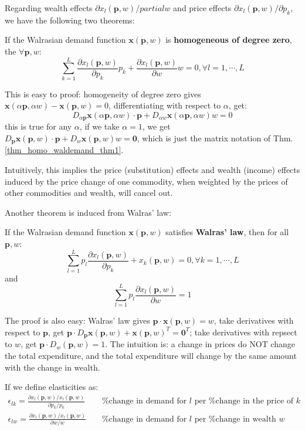 Regarding wealth effects $\partial x_l(\mathbf{p},w)/partial w$ and price effects $\partial x_l(\mathbf{p},w)/\partial p_k$, we have the following two theorems:

\begin{theorem}\label{thm_homo_waldemand_thm1}
    If the Walrasian demand function $\mathbf{x}(\mathbf{p},w)$ is \textbf{homogeneous of degree zero}, the $\forall \mathbf{p},w$:
    $$\sum^L_{k=1}\frac{\partial x_l(\mathbf{p},w)}{\partial p_k}p_k +\frac{\partial x_l(\mathbf{p},w)}{\partial w}w=0,\forall l=1,\cdots,L$$
\end{theorem}

This is easy to proof: homogeneity of degree zero gives $\mathbf{x}(\alpha \mathbf{p},\alpha w)-\mathbf{x}(\mathbf{p},w)=0$, differentiating with respect to $\alpha$, get:
$$D_{\alpha \mathbf{p}}\mathbf{x}(\alpha \mathbf{p},\alpha w)\cdot \mathbf{p} + D_{\alpha w} \mathbf{x}(\alpha \mathbf{p},\alpha w)w=0$$
this is true for any $\alpha$, if we take $\alpha=1$, we get $D_{\mathbf{p}}\mathbf{x}(\mathbf{p}, w)\cdot \mathbf{p} + D_{ w} \mathbf{x}( \mathbf{p}, w)w=\mathbf{0}$, which is just the matrix notation of Thm.\ref{thm_homo_waldemand_thm1}.

Intuitively, this implies the price (substitution) effects and wealth (income) effects induced by the price change of one commodity, when weighted by the prices of other commodities and wealth, will cancel out.

Another theorem is induced from Walras' law:
\begin{theorem}\label{thm_walraslaw_waldemand_thm2}
    If the Walrasian demand function $\mathbf{x}(\mathbf{p},w)$ satisfies \textbf{Walras' law}, then for all $\mathbf{p},w$:
    $$\sum^L_{l=1}p_l\frac{\partial x_l(\mathbf{p},w)}{\partial p_k}+x_k(\mathbf{p},w)=0,\forall k=1,\cdots,L$$
    and
    $$\sum^L_{l=1}p_l\frac{\partial x_l(\mathbf{p},w)}{\partial w}=1$$
\end{theorem}

The proof is also easy: Walras' law gives $\mathbf{p}\cdot \mathbf{x}(\mathbf{p},w)=w$, take derivatives with respect to $\mathbf{p}$, get $\mathbf{p}\cdot D_{\mathbf{p}}\mathbf{x}(\mathbf{p},w)+\mathbf{x}(\mathbf{p},w)^T=\mathbf{0}^T$; take derivatives with repsect to $w$, get $\mathbf{p}\cdot D_{w}(\mathbf{p},w)=1$. The intuition is: a change in prices do NOT change the total expenditure, and the total expenditure will change by the same amount with the change in wealth.

If we define elasticities as:
\begin{align*} 
    \epsilon_{lk}=\frac{\partial x_l(\mathbf{p},w)/x_l(\mathbf{p},w)}{\partial p_k /p_k} && \text{ \% change in demand for $l$ per \% change in the price of $k$} \\ 
    \epsilon_{lw}=\frac{\partial x_l(\mathbf{p},w)/x_l(\mathbf{p},w)}{\partial w/w} && \text{ \% change in demand for $l$ per \% change in wealth $w$}
\end{align*}


